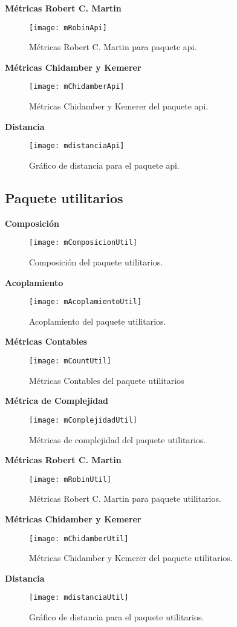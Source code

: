 \textbf{Métricas Robert C. Martin}
\begin{figure}[H]
	\centering
	\texttt{[image: mRobinApi]}
	\centering
	\caption{Métricas Robert C. Martin para paquete api.}
	\label{fig:mRobinApi}
\end{figure}
\clearpage
\textbf{Métricas Chidamber y Kemerer}
\begin{figure}[H]
	\centering
	\texttt{[image: mChidamberApi]}
	\centering
	\caption{Métricas Chidamber y Kemerer del paquete api.}
	\label{fig:mChidamberApi}
\end{figure}
\textbf{Distancia}
\begin{figure}[H]
	\centering
	\texttt{[image: mdistanciaApi]}
	\centering
	\caption{Gráfico de distancia para el paquete api.}
	\label{fig:mdistanciaApi}
\end{figure}
\newpage
\subsection{Paquete utilitarios}

\textbf{Composición}
\begin{figure}[H]
	\centering
	\texttt{[image: mComposicionUtil]}
	\centering
	\caption{Composición del paquete utilitarios.}
	\label{fig:mComposicionUtil}
\end{figure}
\textbf{Acoplamiento}
\begin{figure}[H]
	\centering
	\texttt{[image: mAcoplamientoUtil]}
	\centering
	\caption{Acoplamiento del paquete utilitarios.}
	\label{fig:mAcoplamientoUtil}
\end{figure}
\textbf{Métricas Contables}
\begin{figure}[H]
	\centering
	\texttt{[image: mCountUtil]}
	\centering
	\caption{Métricas Contables del paquete utilitarios}
	\label{fig:mCountApi}
\end{figure}
\textbf{Métrica de Complejidad}
\begin{figure}[H]
	\centering
	\texttt{[image: mComplejidadUtil]}
	\centering
	\caption{Métricas de complejidad del paquete utilitarios.}
	\label{fig:mComplejidadApi}
\end{figure}

\textbf{Métricas Robert C. Martin}
\begin{figure}[H]
	\centering
	\texttt{[image: mRobinUtil]}
	\centering
	\caption{Métricas Robert C. Martin para paquete utilitarios.}
	\label{fig:mRobinUtil}
\end{figure}
\clearpage
\textbf{Métricas Chidamber y Kemerer}
\begin{figure}[H]
	\centering
	\texttt{[image: mChidamberUtil]}
	\centering
	\caption{Métricas Chidamber y Kemerer del paquete utilitarios.}
	\label{fig:mChidamberUtil}
\end{figure}
\textbf{Distancia}
\begin{figure}[H]
	\centering
	\texttt{[image: mdistanciaUtil]}
	\centering
	\caption{Gráfico de distancia para el paquete utilitarios.}
	\label{fig:mdistanciaUtil}
\end{figure}

